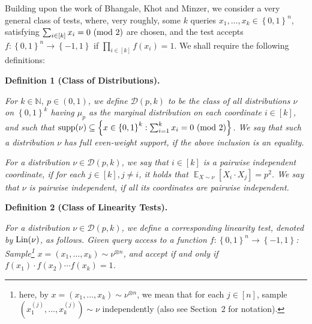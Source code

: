Building upon the work of Bhangale, Khot and Minzer, we consider a very general class of tests, where, very roughly, some $k$ queries $x_{1},\dots,x_{k}\in\left\{0,1\right\}^{n}$, satisfying $\sum_{i\in[k]}x_{i}=0\textnormal{ (mod 2)}$ are chosen, and the test accepts $f:\left\{0,1\right\}^{n}\to\left\{-1,1\right\}$ if $\prod_{i\in[k]}f(x_{i})=1$.
We shall require the following definitions:\par





\par\medskip\noindent\textbf{
\textbf{Definition 1}\textbf{ }(Class of Distributions)\textbf{.}
}\par



\emph{For $k\in\mathbb{N},\ p\in(0,1)$, we define $\mathcal{D}(p,k)$ to be the class of all distributions $\nu$ on $\left\{0,1\right\}^{k}$ having $\mu_{p}$ as the marginal distribution on each coordinate $i\in[k]$, and such that $\textnormal{supp}(\nu)\subseteq\left\{x\in\left\{0,1\right\}^{k}:\sum_{i=1}^{k}x_{i}=0\textnormal{ (mod 2)}\right\}$.
We say that such a distribution $\nu$ has full even-weight support, if the above inclusion is an equality.}\par




\emph{For a distribution $\nu\in\mathcal{D}(p,k)$, we say that $i\in[k]$ is a pairwise independent coordinate, if for each $j\in[k],j\not=i$, it holds that $\mathop{\mathbb{E}}_{X\sim\nu}\left[X_{i}\cdot X_{j}\right]=p^{2}$.
We say that $\nu$ is pairwise independent, if all its coordinates are pairwise independent.}\par







\par\medskip\noindent\textbf{
\textbf{Definition 2}\textbf{ }(Class of Linearity Tests)\textbf{.}
}\par



\emph{For a distribution $\nu\in\mathcal{D}(p,k)$, we define a corresponding linearity test, denoted by $\textnormal{Lin}(\nu)$, as follows.
Given query access to a function $f:\left\{0,1\right\}^{n}\to\left\{-1,1\right\}$:
Sample\footnote{here, by $x=(x_{1},\dots,x_{k})\sim\nu^{\otimes n}$, we mean that for each $j\in[n]$, sample $(x_{1}^{\left(j\right)},\dots,x_{k}^{\left(j\right)})\sim\nu$ independently (also see Section 2 for notation).} $x=(x_{1},\dots,x_{k})\sim\nu^{\otimes n}$, and accept if and only if $f(x_{1})\cdot f(x_{2})\cdots f(x_{k})=1$.}\par



